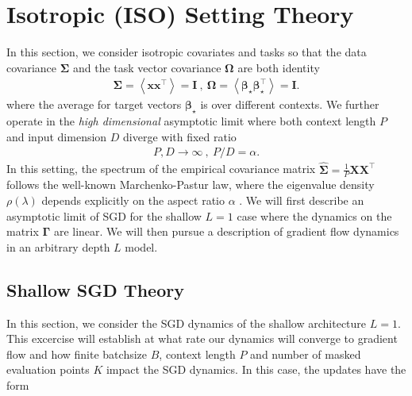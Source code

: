 \documentclass{article} %
\begin{document}
\section{Isotropic (\textbf{ISO}) Setting Theory}

In this section, we consider isotropic covariates and tasks so that the data covariance $\bm\Sigma$ and the task vector covariance $\bm\Omega$ are both identity
\begin{align}
    \bm \Sigma= \left< \bm x \bm x^\top \right> = \bm I  \ , \ \bm\Omega = \left< \bm\beta_\star \bm\beta_\star^\top \right> = \bm I .
\end{align}
where the average for target vectors $\bm\beta_\star$ is over different contexts. We further operate in the \textit{high dimensional} asymptotic limit where both context length $P$ and input dimension $D$ diverge with fixed ratio 
\begin{align}
    P,D \to \infty \ , \ P / D = \alpha .
\end{align}
In this setting, the spectrum of the empirical covariance matrix $\hat{\bm\Sigma} = \frac{1}{P} \bm X \bm X^\top$ follows the well-known Marchenko-Pastur law, where the eigenvalue density $\rho(\lambda)$ depends explicitly on the aspect ratio $\alpha$ \citep{potters2020first, advani2020high}. We will first describe an asymptotic limit of SGD for the shallow $L=1$ case where the dynamics on the matrix $\bm\Gamma$ are linear. We will then pursue a description of gradient flow dynamics in an arbitrary depth $L$ model. 


\subsection{Shallow SGD Theory}\label{app:shallow_sgd}

In this section, we consider the SGD dynamics of the shallow architecture $L=1$. This excercise will establish at what rate our dynamics will converge to gradient flow and how finite batchsize $B$, context length $P$ and number of masked evaluation points $K$ impact the SGD dynamics. In this case, the updates have the form 
\end{document}
